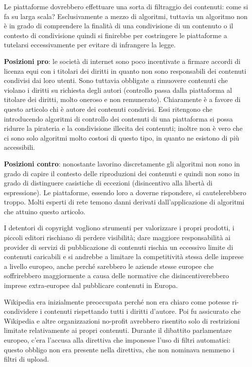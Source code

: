 \begin{itemize}
   Le piattaforme dovrebbero effettuare una sorta di filtraggio dei contenuti: come si fa su larga scala? Esclusivamente a mezzo di algoritmi, tuttavia un algoritmo non è in grado di comprendere la finalità di una condivisione di un contenuto o il contesto di condivisione quindi si finirebbe per costringere le piattaforme a tutelarsi eccessivamente per evitare di infrangere la legge. 
   
   \textbf{Posizioni pro}: le società di internet sono poco incentivate a firmare accordi di licenza equi con i titolari dei diritti in quanto non sono responsabili dei contenuti condivisi dai loro utenti. Sono tuttavia obbligate a rimuovere contenuti che violano i diritti su richiesta degli autori (controllo passa dalla piattaforma al titolare dei diritti, molto oneroso e non remunerato). Chiaramente è a favore di questo articolo chi è autore dei contenuti condivisi. Essi ritengono che introducendo algoritmi di controllo dei contenuti di una piattaforma si possa ridurre la pirateria e la condivisione illecita dei contenuti; inoltre non è vero che ci sono solo algoritmi molto costosi di questo tipo, in quanto ne esistono di più accessibili. 
   
   \textbf{Posizioni contro}: nonostante lavorino discretamente gli algoritmi non sono in grado di capire il contesto delle riproduzioni dei contenuti e quindi non sono in grado di distinguere casistiche di eccezioni (disincentivo alla libertà di espressione). Le piattaforme, essendo loro a doverne rispondere, si cautelerebbero troppo. Molti esperti di rete temono danni derivati dall'applicazione di algoritmi che attuino questo articolo.   
\end{itemize}

I detentori di copyright vogliono strumenti per valorizzare i propri prodotti, i piccoli editori rischiano di perdere visibilità; dare maggiore responsabilità ai provider di servizi di pubblicazione di contenuti rischia un eccessivo limite di contenuti caricabili e si andrebbe a limitare la competitività stessa delle imprese a livello europeo, anche perché sarebbero le aziende stesse europee che soffrirebbero maggiormente a causa delle normative che disincentiverebbero imprese extra-europee dal pubblicare contenuti in Europa. 

Wikipedia era inizialmente preoccupata perché non era chiaro come potesse ri-condividere i contenuti rispettando tutti i diritti d'autore. Poi fu assicurato che Wikipedia e altre organizzazioni no-profit avrebbero risentito solo di restrizioni limitate relativamente ai propri contenuti. 
Durante il dibattito parlamentare europeo, c'era l'accusa alla direttiva che imponesse l'uso di filtri automatici: questo obbligo non era presente nella direttiva, che non nominava nemmeno i filtri di upload. 

